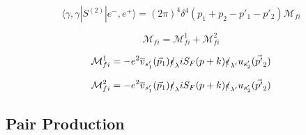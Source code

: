 \documentclass[a4]{article}
\begin{document}
        \begin{framed}

            \begin{equation}
                \langle \gamma, \gamma | S^{(2)} | e^{-}, e^{+} \rangle = (2 \pi)^{4} \delta^{4} (p_1 + p_2 - p'_1 - p'_2) \mathcal{M}_{fi}
            \end{equation}

            \begin{equation}
                \mathcal{M}_{fi} = \mathcal{M}_{fi}^{1} + \mathcal{M}_{fi}^{2}
            \end{equation}

            \begin{equation}
                \mathcal{M}_{fi}^{1} = -e^{2} \overline{v}_{s'_1} (\vec{p}_1) \slashed{\epsilon}_{\lambda} i S_{F} (p + k) \slashed{\epsilon}_{\lambda'} u_{s'_2} (\vec{p'}_2)
            \end{equation}

            \begin{equation}
                \mathcal{M}_{fi}^{2} = -e^{2} \overline{v}_{s'_1} (\vec{p}_1) \slashed{\epsilon}_{\lambda} i S_{F} (p + k) \slashed{\epsilon}_{\lambda'} u_{s'_2} (\vec{p'}_2)
            \end{equation}

        \end{framed}

        \subsection{Pair Production}
\end{document}
